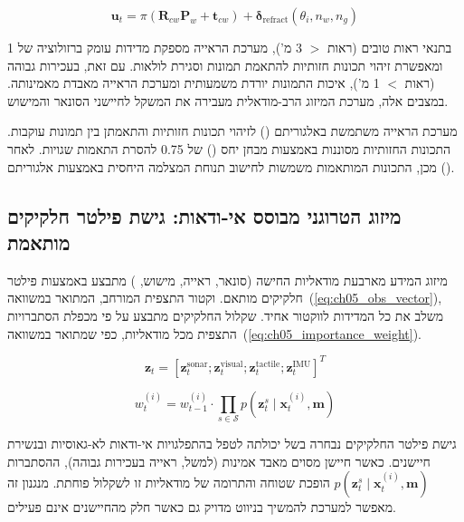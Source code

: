 \begin{equation}
\mathbf{u}_t = \pi(\mathbf{R}_{cw} \mathbf{P}_w + \mathbf{t}_{cw}) + \boldsymbol{\delta}_{\text{refract}}(\theta_i, n_w, n_g)
\label{eq:ch05_visual_model}
\end{equation}

בתנאי ראות טובים (ראות $>$ 3 מ'), מערכת הראייה מספקת מדידות עומק ברזולוציה של 1  ומאפשרת זיהוי תכונות חזותיות להתאמת תמונות וסגירת לולאות. עם זאת, בעכירות גבוהה (ראות $<$ 1 מ'), איכות התמונות יורדת משמעותית ומערכת הראייה מאבדת מאמינותה. במצבים אלה, מערכת המיזוג הרב-מודאלית מעבירה את המשקל לחיישני הסונאר והמישוש.

מערכת הראייה משתמשת באלגוריתם  () לזיהוי תכונות חזותיות והתאמתן בין תמונות עוקבות. התכונות החזותיות מסוננות באמצעות מבחן יחס () של 0.75 להסרת התאמות שגויות. לאחר מכן, התכונות המותאמות משמשות לחישוב תנוחת המצלמה היחסית באמצעות אלגוריתם  ().

\subsection{מיזוג הטרוגני מבוסס אי-ודאות: גישת פילטר חלקיקים מותאמת}
\label{sec:ch05_particle_filter}

מיזוג המידע מארבעת מודאליות החישה (סונאר, ראייה, מישוש, ) מתבצע באמצעות פילטר חלקיקים מותאם. וקטור התצפית המורחב, המתואר במשוואה~(\ref{eq:ch05_obs_vector}), משלב את כל המדידות לווקטור אחיד. שקלול החלקיקים מתבצע על פי מכפלת הסתברויות התצפית מכל מודאליות, כפי שמתואר במשוואה~(\ref{eq:ch05_importance_weight}).

\begin{equation}
\mathbf{z}_t = [\mathbf{z}_t^{\text{sonar}}; \mathbf{z}_t^{\text{visual}}; \mathbf{z}_t^{\text{tactile}}; \mathbf{z}_t^{\text{IMU}}]^T
\label{eq:ch05_obs_vector}
\end{equation}

\begin{equation}
w_t^{(i)} = w_{t-1}^{(i)} \cdot \prod_{s \in \mathcal{S}} p(\mathbf{z}_t^s \mid \mathbf{x}_t^{(i)}, \mathbf{m})
\label{eq:ch05_importance_weight}
\end{equation}

גישת פילטר החלקיקים נבחרה בשל יכולתה לטפל בהתפלגויות אי-ודאות לא-גאוסיות ובנשירת חיישנים. כאשר חיישן מסוים מאבד אמינות (למשל, ראייה בעכירות גבוהה), ההסתברות $p(\mathbf{z}_t^s \mid \mathbf{x}_t^{(i)}, \mathbf{m})$ הופכת שטוחה והתרומה של מודאליות זו לשקלול פוחתת. מנגנון זה מאפשר למערכת להמשיך בניווט מדויק גם כאשר חלק מהחיישנים אינם פעילים.

